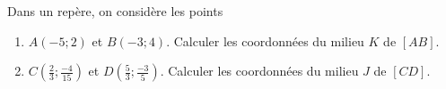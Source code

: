 
Dans un repère, on considère les points 
\begin{enumerate}
\item $A(-5;2)$ et $B(-3;4)$. Calculer les coordonnées du milieu $K$ de $[AB]$.
\item $C \left( \frac{2}{3}; \frac{-4}{15} \right)$ et $D \left( \frac{5}{3}; \frac{-3}{5} \right)$. Calculer les coordonnées du milieu $J$ de $[CD]$.
\end{enumerate}

 